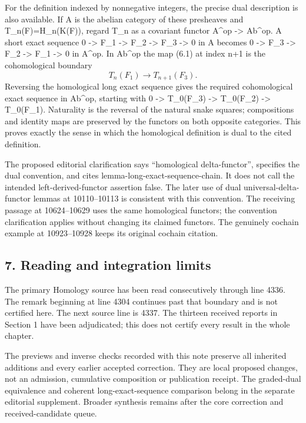 \documentclass[11pt]{article}
\begin{document}
For the definition indexed by nonnegative integers, the precise dual description is also available. If A is the abelian category of these presheaves and T\_n(F)=H\_n(K(F)), regard T\_n as a covariant functor A\^{}op -\textgreater{} Ab\^{}op. A short exact sequence 0 -\textgreater{} F\_1 -\textgreater{} F\_2 -\textgreater{} F\_3 -\textgreater{} 0 in A becomes 0 -\textgreater{} F\_3 -\textgreater{} F\_2 -\textgreater{} F\_1 -\textgreater{} 0 in A\^{}op. In Ab\^{}op the map (6.1) at index n+1 is the cohomological boundary \[
T_n(F_1)\longrightarrow T_{n+1}(F_3).
\] Reversing the homological long exact sequence gives the required cohomological exact sequence in Ab\^{}op, starting with 0 -\textgreater{} T\_0(F\_3) -\textgreater{} T\_0(F\_2) -\textgreater{} T\_0(F\_1). Naturality is the reversal of the natural snake squares; compositions and identity maps are preserved by the functors on both opposite categories. This proves exactly the sense in which the homological definition is dual to the cited definition.

The proposed editorial clarification says ``homological delta-functor'', specifies the dual convention, and cites lemma-long-exact-sequence-chain. It does not call the intended left-derived-functor assertion false. The later use of dual universal-delta-functor lemmas at 10110--10113 is consistent with this convention. The receiving passage at 10624--10629 uses the same homological functors; the convention clarification applies without changing its claimed functors. The genuinely cochain example at 10923--10928 keeps its original cochain citation.

\subsection{7. Reading and integration limits}\label{note-03-reading-and-integration-limits}

The primary Homology source has been read consecutively through line 4336. The remark beginning at line 4304 continues past that boundary and is not certified here. The next source line is 4337. The thirteen received reports in Section 1 have been adjudicated; this does not certify every result in the whole chapter.

The previews and inverse checks recorded with this note preserve all inherited additions and every earlier accepted correction. They are local proposed changes, not an admission, cumulative composition or publication receipt. The graded-dual equivalence and coherent long-exact-sequence comparison belong in the separate editorial supplement. Broader synthesis remains after the core correction and received-candidate queue.
\clearpage
\end{document}
